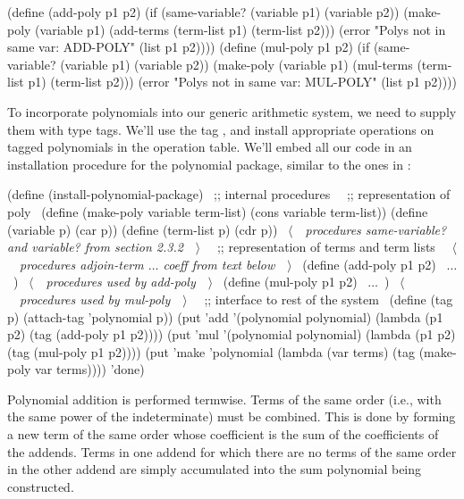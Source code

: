 \begin{codeBlock}
(define (add-poly p1 p2)
  (if (same-variable? (variable p1)
                      (variable p2))
      (make-poly (variable p1)
                 (add-terms (term-list p1)
                            (term-list p2)))
      (error "Polys not in same var: ADD-POLY"
             (list p1 p2))))
(define (mul-poly p1 p2)
  (if (same-variable? (variable p1)
                      (variable p2))
      (make-poly (variable p1)
                 (mul-terms (term-list p1)
                            (term-list p2)))
      (error "Polys not in same var: MUL-POLY"
             (list p1 p2))))
\end{codeBlock}

\noindent
To incorporate polynomials into our generic arithmetic system, we need to
supply them with type tags.  We'll use the tag , and install
appropriate operations on tagged polynomials in the operation table.  We'll
embed all our code in an installation procedure for the polynomial package,
similar to the ones in :

\begin{codeBlock}
(define (install-polynomial-package)
  ~\textrm{;; internal procedures}~
  ~\textrm{;; representation of poly}~
  (define (make-poly variable term-list)
    (cons variable term-list))
  (define (variable p) (car p))
  (define (term-list p) (cdr p))
  ~\(\langle \)~~\emph{procedures \emph{same-variable?} and \emph{variable?} from section 2.3.2}~~\(\rangle \)~
  ~\textrm{;; representation of terms and term lists}~
  ~\(\langle \)~~\emph{procedures \emph{adjoin-term} \( \dots \) \emph{coeff} from text below}~~\(\rangle \)~
  (define (add-poly p1 p2) ~\( \dots \)~)
  ~\(\langle \)~~\emph{procedures used by \emph{add-poly}}~~\(\rangle \)~
  (define (mul-poly p1 p2) ~\( \dots \)~)
  ~\(\langle \)~~\emph{procedures used by \emph{mul-poly}}~~\(\rangle \)~
  ~\textrm{;; interface to rest of the system}~
  (define (tag p) (attach-tag 'polynomial p))
  (put 'add '(polynomial polynomial)
       (lambda (p1 p2) (tag (add-poly p1 p2))))
  (put 'mul '(polynomial polynomial)
       (lambda (p1 p2) (tag (mul-poly p1 p2))))
  (put 'make 'polynomial
       (lambda (var terms)
         (tag (make-poly var terms))))
  'done)
\end{codeBlock}

\noindent
Polynomial addition is performed termwise.  Terms of the same order (i.e., with
the same power of the indeterminate) must be combined.  This is done by forming
a new term of the same order whose coefficient is the sum of the coefficients
of the addends.  Terms in one addend for which there are no terms of the same
order in the other addend are simply accumulated into the sum polynomial being
constructed.

